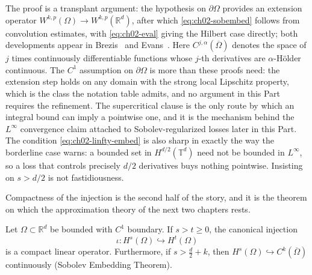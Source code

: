The proof is a transplant argument: the hypothesis on $\partial\Omega$ provides an extension operator $W^{k,p}(\Omega) \to W^{k,p}(\mathbb{R}^d)$, after which \eqref{eq:ch02-sobembed} follows from convolution estimates, with \eqref{eq:ch02-eval} giving the Hilbert case directly; both developments appear in Brezis~\cite{brezis2011functional} and Evans~\cite{evans2010partial}. Here $C^{j,\alpha}(\overline{\Omega})$ denotes the space of $j$ times continuously differentiable functions whose $j$-th derivatives are $\alpha$-H\"older continuous. The $C^1$ assumption on $\partial\Omega$ is more than these proofs need: the extension step holds on any domain with the strong local Lipschitz property, which is the class the notation table admits, and no argument in this Part requires the refinement. The supercritical clause is the only route by which an integral bound can imply a pointwise one, and it is the mechanism behind the $L^\infty$ convergence claim attached to Sobolev-regularized losses later in this Part. The condition \eqref{eq:ch02-linfty-embed} is also sharp in exactly the way the borderline case warns: a bounded set in $H^{d/2}(\mathbb{T}^d)$ need not be bounded in $L^\infty$, so a loss that controls precisely $d/2$ derivatives buys nothing pointwise. Insisting on $s > d/2$ is not fastidiousness.

Compactness of the injection is the second half of the story, and it is the theorem on which the approximation theory of the next two chapters rests.

\begin{theorem}
\label{thm:ch02-rellich}
Let $\Omega \subset \mathbb{R}^d$ be bounded with $C^1$ boundary. If $s > t \ge 0$, the canonical injection
\begin{equation}
  \iota : H^s(\Omega) \hookrightarrow H^t(\Omega)
  \label{eq:ch02-injection}
\end{equation}
is a compact linear operator. Furthermore, if $s > \frac{d}{2} + k$, then $H^s(\Omega) \hookrightarrow C^k(\overline{\Omega})$ continuously (Sobolev Embedding Theorem).
\end{theorem}

